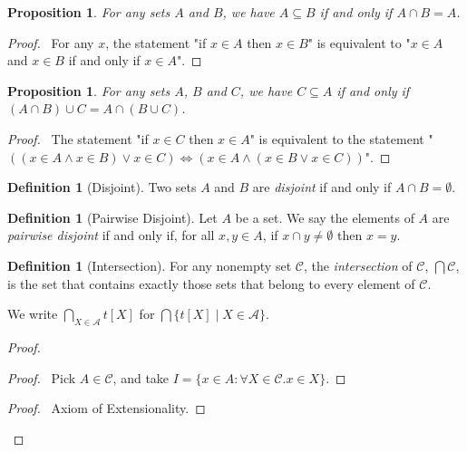 \documentclass{report}
\let\qed\relax
\newtheorem{prop}[ax]{Proposition}
\theoremstyle{definition}
\newtheorem{df}[ax]{Definition}
\begin{document}
\begin{prop}
For any sets $A$ and $B$, we have $A \subseteq B$ if and only if $A \cap B = A$.
\end{prop}

\begin{proof}
\pf\ For any $x$, the statement "if $x \in A$ then $x \in B$" is equivalent to "$x \in A$ and $x \in B$ if and only if $x \in A$". \qed
\end{proof}

\begin{prop}
For any sets $A$, $B$ and $C$, we have $C \subseteq A$ if and only if $(A \cap B) \cup C = A \cap (B \cup C)$.
\end{prop}

\begin{proof}
\pf\ The statement "if $x \in C$ then $x \in A$" is equivalent to the statement "$((x \in A \wedge x \in B) \vee x \in C) \Leftrightarrow (x \in A \wedge (x \in B \vee x \in C))$". \qed
\end{proof}

\begin{df}[Disjoint]
Two sets $A$ and $B$ are \emph{disjoint} if and only if $A \cap B = \emptyset$.
\end{df}

\begin{df}[Pairwise Disjoint]
Let $A$ be a set. We say the elements of $A$ are \emph{pairwise disjoint} if and only if, for all $x, y \in A$, if $x \cap y \neq \emptyset$ then $x = y$.
\end{df}

\begin{df}[Intersection]
For any nonempty set $\mathcal{C}$, the \emph{intersection} of $\mathcal{C}$, $\bigcap \mathcal{C}$, is the set that contains exactly those sets that belong to every element of $\mathcal{C}$.

We write $\bigcap_{X \in \mathcal{A}} t[X]$ for $\bigcap \{t[X] \mid X \in \mathcal{A} \}$.
\end{df}

\begin{proof}
\pf
{}
\begin{proof}
	\pf\ Pick $A \in \mathcal{C}$, and take $I = \{ x \in A : \forall X \in \mathcal{C}. x \in X \}$.
\end{proof}
\begin{proof}
	\pf\ Axiom of Extensionality.
\end{proof}
\qed
\end{proof}
\end{document}
